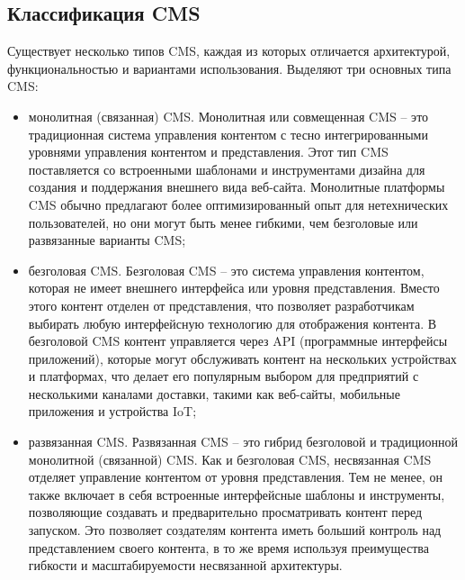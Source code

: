 \subsection{Классификация CMS}
Существует несколько типов CMS, каждая из которых отличается архитектурой, функциональностью и вариантами использования. Выделяют три основных типа CMS:
\begin{itemize}
	\item монолитная (связанная) CMS. Монолитная или совмещенная CMS -- это традиционная система управления контентом с тесно интегрированными уровнями управления контентом и представления. Этот тип CMS поставляется со встроенными шаблонами и инструментами дизайна для создания и поддержания внешнего вида веб-сайта. Монолитные платформы CMS обычно предлагают более оптимизированный опыт для нетехнических пользователей, но они могут быть менее гибкими, чем безголовые или развязанные варианты CMS;
	\item безголовая CMS. Безголовая CMS -- это система управления контентом, которая не имеет внешнего интерфейса или уровня представления. Вместо этого контент отделен от представления, что позволяет разработчикам выбирать любую интерфейсную технологию для отображения контента. В безголовой CMS контент управляется через API (программные интерфейсы приложений), которые могут обслуживать контент на нескольких устройствах и платформах, что делает его популярным выбором для предприятий с несколькими каналами доставки, такими как веб-сайты, мобильные приложения и устройства IoT;
	\item развязанная CMS. Развязанная CMS -- это гибрид безголовой и традиционной монолитной (связанной) CMS. Как и безголовая CMS, несвязанная CMS отделяет управление контентом от уровня представления. Тем не менее, он также включает в себя встроенные интерфейсные шаблоны и инструменты, позволяющие создавать и предварительно просматривать контент перед запуском. Это позволяет создателям контента иметь больший контроль над представлением своего контента, в то же время используя преимущества гибкости и масштабируемости несвязанной архитектуры.
\end{itemize}

